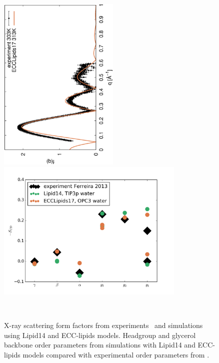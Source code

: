 \documentclass[aip,jcp,twocolumn]{revtex4}
\begin{document}
\begin{figure}[]
  \centering
  \includegraphics[height=8.5cm,angle=-90]{../Fig/form-f_exp-l14-eccl17.eps}
  \includegraphics[width=9.0cm]{../Fig/ipython_nb/Headgr_OPs_exp-L14-ECCL17.png}
  \caption{\label{simVSexpNOions}
    X-ray scattering form factors from experiments~\cite{Kucerka2011} and simulations using Lipid14 \cite{dickson14} and ECC-lipids models. 
    Headgroup and glycerol backbone order parameters from simulations with Lipid14 \cite{dickson14} and ECC-lipids models
    compared with experimental order parameters from \cite{ferreira13}.}
   \\
\end{figure}
\end{document}
